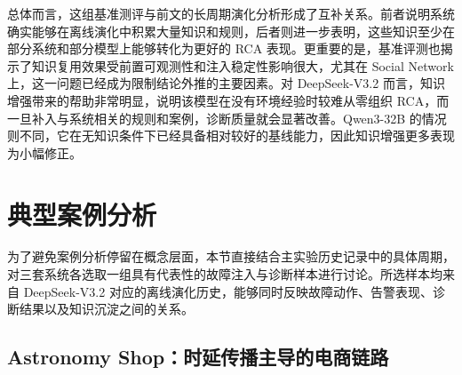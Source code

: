 \begin{table}[htbp]
    \centering
    \caption{AIOpsLab 基准测评的分系统结果}
    \label{tab:benchmark-by-system}
    \small
\end{table}

总体而言，这组基准测评与前文的长周期演化分析形成了互补关系。前者说明系统确实能够在离线演化中积累大量知识和规则，后者则进一步表明，这些知识至少在部分系统和部分模型上能够转化为更好的 RCA 表现。更重要的是，基准评测也揭示了知识复用效果受前置可观测性和注入稳定性影响很大，尤其在 Social Network 上，这一问题已经成为限制结论外推的主要因素。对 DeepSeek-V3.2 而言，知识增强带来的帮助非常明显，说明该模型在没有环境经验时较难从零组织 RCA，而一旦补入与系统相关的规则和案例，诊断质量就会显著改善。Qwen3-32B 的情况则不同，它在无知识条件下已经具备相对较好的基线能力，因此知识增强更多表现为小幅修正。

\section{典型案例分析}
\label{sec:case_study}

为了避免案例分析停留在概念层面，本节直接结合主实验历史记录中的具体周期，对三套系统各选取一组具有代表性的故障注入与诊断样本进行讨论。所选样本均来自 DeepSeek-V3.2 对应的离线演化历史，能够同时反映故障动作、告警表现、诊断结果以及知识沉淀之间的关系。

\subsection{Astronomy Shop：时延传播主导的电商链路}

